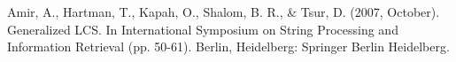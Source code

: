 \documentclass[]{article}
\begin{document}




\begin{thebibliography}{9}
	Amir, A., Hartman, T., Kapah, O., Shalom, B. R., \& Tsur, D. (2007, October). Generalized {LCS}. In International Symposium on String Processing and Information Retrieval (pp. 50-61). Berlin, Heidelberg: Springer Berlin Heidelberg.
	
 
\end{thebibliography}
\end{document}
